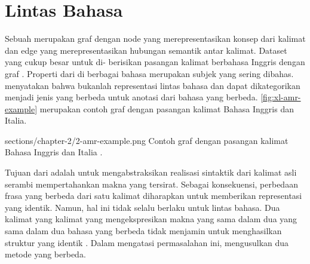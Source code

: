 \section{\amrparsing{} Lintas Bahasa}

Sebuah \AMR{} merupakan graf dengan node yang merepresentasikan konsep dari kalimat dan edge yang merepresentasikan hubungan semantik antar kalimat.
Dataset \AMR{} yang cukup besar untuk di- berisikan pasangan kalimat berbahasa Inggris dengan graf \AMR{}.
Properti  dari \AMR{} di berbagai bahasa merupakan subjek yang sering dibahas.
\textcite{banarescu2013} menyatakan bahwa \AMR{} bukanlah representasi lintas bahasa dan dapat dikategorikan menjadi jenis \AMR{} yang berbeda untuk anotasi dari bahasa yang berbeda.
\cref{fig:xl-amr-example} merupakan contoh graf \AMR{} dengan pasangan kalimat Bahasa Inggris dan Italia.

  {sections/chapter-2/2-amr-example.png}
  {Contoh graf \AMR{} dengan pasangan kalimat Bahasa Inggris dan Italia .}

Tujuan dari \AMR{} adalah untuk mengabstraksikan realisasi sintaktik dari kalimat asli serambi mempertahankan makna yang tersirat.
Sebagai konsekuensi, perbedaan frasa yang berbeda dari satu kalimat diharapkan untuk memberikan representasi \AMR{} yang identik.
Namun, hal ini tidak selalu berlaku untuk lintas bahasa.
Dua kalimat yang kalimat yang mengekspresikan makna yang sama dalam dua yang sama dalam dua bahasa yang berbeda tidak menjamin untuk menghasilkan struktur \AMR{} yang identik .
Dalam mengatasi permasalahan ini, \textcite{damonte2018} mengusulkan dua metode yang berbeda.

